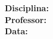 \documentclass[10pt,a4paper]{article}
\begin{document}
\begin{center}\Large\textbf{\tituloProva}\end{center}
\noindent\textbf{Disciplina:} \disciplinaProva\\
\textbf{Professor:} \professorProva\\
\textbf{Data:} \dataProva
\bigskip
\end{document}
